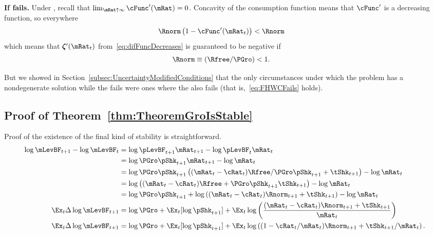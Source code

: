 \documentclass[\econtexRoot/BufferStockTheory]{subfiles}
\begin{document}
\textbf{If {\RIC} fails.}
Under \cncl{\RIC}, recall that $\lim_{\mRat \uparrow \infty} \cFunc^{\prime}(\mRat) = 0$.  Concavity of the consumption function means that $\cFunc^{\prime}$ is a decreasing function, so everywhere 
\begin{align*}
  \Rnorm\left(1-\cFunc^{\prime}({\mRat}_t)\right) & < \Rnorm
\end{align*}
which means that $\difFunc^{\prime}(\mRat_{t})$ from~\eqref{eq:difFuncDecreases} is guaranteed to be negative if
\begin{align}
  \Rnorm \equiv (\Rfree/\PGro) & < 1  \label{eq:FHWCFails}.
\end{align}

But we showed in Section~\ref{subsec:UncertaintyModifiedConditions} that the only circumstances under which the problem has a nondegenerate solution while the {\RIC} fails were ones where the {\FHWC} also fails (that is,~\eqref{eq:FHWCFails} holds).



\subsection{Proof of Theorem~\ref{thm:TheoremGroIsStable}}

Proof of the existence of the final kind of stability is straightforward.  
\begin{equation}\begin{split}
  \log \mLevBF_{t+1} - \log \mLevBF_{t} &  = \log \pLevBF_{t+1} \mRat_{t+1} - \log \pLevBF_{t} \mRat_{t} 
\\ & =   \log \PGro\pShk_{t+1} \mRat_{t+1} - \log \mRat_{t}
\\   & = \log \PGro\pShk_{t+1} \left((\mRat_{t}-\cRat_{t})\Rfree/\PGro\pShk_{t+1}+\tShk_{t+1}\right) - \log \mRat_{t}
\\   & = \log \left((\mRat_{t}-\cRat_{t})\Rfree+\PGro\pShk_{t+1}\tShk_{t+1}\right) - \log \mRat_{t}
\\   & = \log \PGro\pShk_{t+1} + \log \left((\mRat_{t}-\cRat_{t})\Rnorm_{t+1}+\tShk_{t+1}\right) - \log \mRat_{t}
\\  \Ex_{t} \Delta \log \mLevBF_{t+1} & = \log \PGro + \Ex_{t}[\log \pShk_{t+1}] + \Ex_{t} \log \left(\frac{(\mRat_{t}-\cRat_{t})\Rnorm_{t+1}+\tShk_{t+1}}{\mRat_{t}}\right) 
\\  \Ex_{t} \Delta \log \mLevBF_{t+1} & = \log \PGro + \Ex_{t}[\log \pShk_{t+1}] + \Ex_{t} \log \left((1-\cRat_{t}/\mRat_{t})\Rnorm_{t+1}+\tShk_{t+1}/\mRat_{t}\right) .
\end{split}\end{equation}
\end{document}
